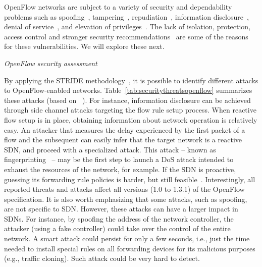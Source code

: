 OpenFlow networks are subject to a variety of security and dependability problems such as spoofing~\cite{kloti2013}, tampering~\cite{kloti2013}, 
repudiation~\cite{kloti2013}, information disclosure~\cite{kloti2013}, denial of service~\cite{kloti2013,shin2013,benton2013}, and elevation of privileges~\cite{kloti2013}.
The lack of isolation, protection, access control and stronger security recommendations~\cite{wasserman2013,shin2013,porras2012,benton2013} are some of the reasons for these vulnerabilities.
We will explore these next.


\vspace{2mm}
\noindent \textit{OpenFlow security assessment}

By applying the STRIDE methodology~\cite{hernan2006}, it is possible to identify different attacks to OpenFlow-enabled networks.
Table~\ref{tab:securitythreatsopenflow} summarizes these attacks (based on ~\cite{kloti2013}). 
For instance, information disclosure can be achieved through side channel attacks targeting the flow rule setup process. 
When reactive flow setup is in place, obtaining information about network operation is relatively easy.
An attacker that measures the delay experienced by the first packet of a flow and the subsequent can easily infer that the target network is a reactive SDN, and proceed with a specialized attack. 
This attack -- known as fingerprinting~\cite{shin2013} -- may be the first step to launch a DoS attack intended to exhaust the resources of the network, for example. 
If the SDN is proactive, guessing its forwarding rule policies is harder, but still feasible~\cite{kloti2013}. 
Interestingly, all reported threats and attacks affect all versions (1.0 to 1.3.1) of the OpenFlow specification. 
It is also worth emphasizing that some attacks, such as spoofing, are not specific to SDN. 
However, these attacks can have a larger impact in SDNs. 
For instance, by spoofing the address of the network controller, the attacker (using a fake controller) could  take over the control of the entire network. 
A smart attack could persist for only a few seconds, i.e., just the time needed to install special rules on all forwarding devices for its malicious purposes (e.g., traffic cloning). 
Such attack could be very hard to detect.


